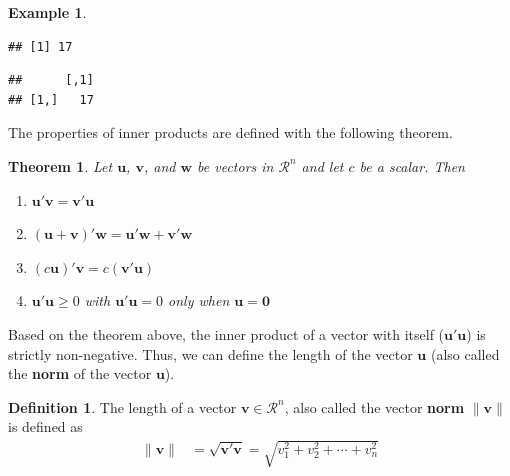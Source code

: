\documentclass[
]{book}
\newenvironment{Shaded}{\begin{snugshade}}{\end{snugshade}}
\newcommand{\KeywordTok}[1]{\textcolor[rgb]{0.13,0.29,0.53}{\textbf{#1}}}
\newcommand{\NormalTok}[1]{#1}
\newcommand{\OperatorTok}[1]{\textcolor[rgb]{0.81,0.36,0.00}{\textbf{#1}}}
\newcommand{\StringTok}[1]{\textcolor[rgb]{0.31,0.60,0.02}{#1}}
\newtheorem{theorem}{Theorem}[chapter]
\theoremstyle{definition}
\newtheorem{definition}{Definition}[chapter]
\theoremstyle{definition}
\newtheorem{example}{Example}[chapter]
\theoremstyle{definition}
\theoremstyle{definition}
\theoremstyle{remark}
\begin{document}
\begin{example}
\begin{verbatim}
## [1] 17
\end{verbatim}

\begin{Shaded}
\end{Shaded}

\begin{verbatim}
##      [,1]
## [1,]   17
\end{verbatim}

\end{example}

The properties of inner products are defined with the following theorem.

\begin{theorem}

Let \(\mathbf{u}\), \(\mathbf{v}\), and \(\mathbf{w}\) be vectors in \(\mathcal{R}^n\) and let \(c\) be a scalar. Then

\begin{enumerate}
\def\labelenumi{\alph{enumi})}
\item
  \(\mathbf{u}'\mathbf{v} = \mathbf{v}'\mathbf{u}\)
\item
  \((\mathbf{u} + \mathbf{v})' \mathbf{w} = \mathbf{u}' \mathbf{w} + \mathbf{v}' \mathbf{w}\)
\item
  \(( c \mathbf{u} )' \mathbf{v} = c ( \mathbf{v}'\mathbf{u} )\)
\item
  \(\mathbf{u}'\mathbf{u} \geq 0\) with \(\mathbf{u}'\mathbf{u} = 0\) only when \(\mathbf{u} = \mathbf{0}\)
\end{enumerate}

\end{theorem}

Based on the theorem above, the inner product of a vector with itself (\(\mathbf{u}'\mathbf{u}\)) is strictly non-negative. Thus, we can define the length of the vector \(\mathbf{u}\) (also called the \textbf{norm} of the vector \(\mathbf{u}\)).

\begin{definition}
The length of a vector \(\mathbf{v} \in \mathcal{R}^n\), also called the vector \textbf{norm} \(\| \mathbf{v} \|\) is defined as
\[
\begin{aligned}
\| \mathbf{v} \| & = \sqrt{\mathbf{v}'\mathbf{v}} = \sqrt{v_1^2 + v_2^2 + \cdots + v_n^2}
\end{aligned}
\]
\end{definition}
\end{document}
